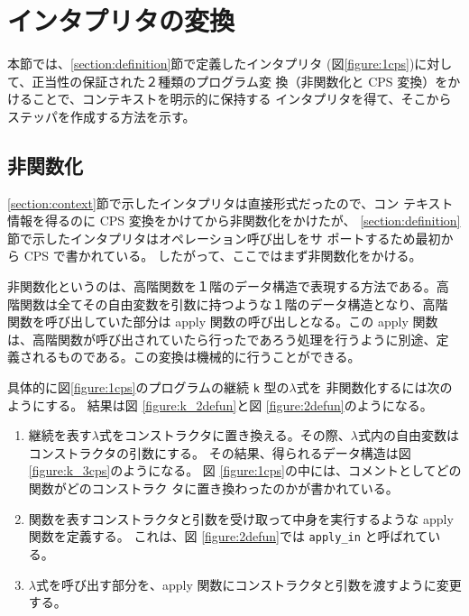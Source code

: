 \section{インタプリタの変換}
\label{section:transform}

本節では、\ref{section:definition}節で定義したインタプリタ
(図\ref{figure:1cps})に対して、正当性の保証された２種類のプログラム変
換（非関数化と CPS 変換）をかけることで、コンテキストを明示的に保持する
インタプリタを得て、そこからステッパを作成する方法を示す。


\subsection{非関数化}
\label{section:2defun}

\ref{section:context}節で示したインタプリタは直接形式だったので、コン
テキスト情報を得るのに CPS 変換をかけてから非関数化をかけたが、
\ref{section:definition}節で示したインタプリタはオペレーション呼び出しをサ
ポートするため最初から CPS で書かれている。
したがって、ここではまず非関数化をかける。

非関数化というのは、高階関数を１階のデータ構造で表現する方法である。高
階関数は全てその自由変数を引数に持つような１階のデータ構造となり、高階
関数を呼び出していた部分は apply 関数の呼び出しとなる。この apply 関数
は、高階関数が呼び出されていたら行ったであろう処理を行うように別途、定
義されるものである。この変換は機械的に行うことができる。

具体的に図\ref{figure:1cps}のプログラムの継続 \texttt{k} 型の$\lambda$式を
非関数化するには次のようにする。
結果は図 \ref{figure:k_2defun}と図 \ref{figure:2defun}のようになる。

\begin{enumerate}
\item 継続を表す$\lambda$式をコンストラクタに置き換える。その際、$\lambda$式内の自由変数はコンストラクタの引数にする。
その結果、得られるデータ構造は図 \ref{figure:k_3cps}のようになる。
図 \ref{figure:1cps}の中には、コメントとしてどの関数がどのコンストラク
タに置き換わったのかが書かれている。
\item 関数を表すコンストラクタと引数を受け取って中身を実行するような apply 関数を定義する。
これは、図 \ref{figure:2defun}では \texttt{apply\_in} と呼ばれている。
\item $\lambda$式を呼び出す部分を、apply 関数にコンストラクタと引数を渡すように変更する。
\end{enumerate}

